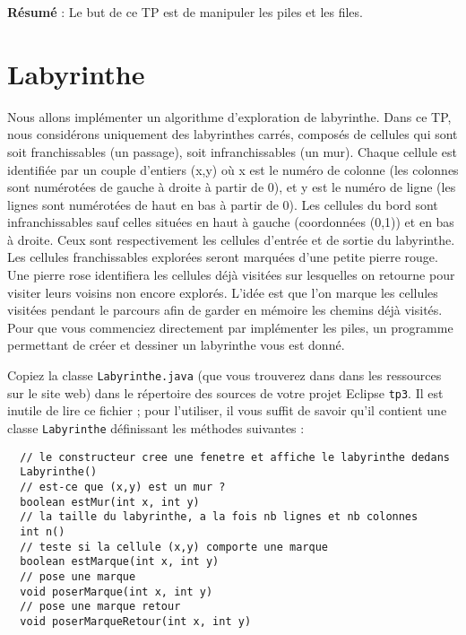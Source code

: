 \documentclass[iutinfo,a4paper,nocorrections,10pt]{ustl-tdtp}
\date{\annee{2018}--\annee{2019}}
\begin{document}
\maketitle
\thispagestyle{empty}


\sloppy
\textbf{Résumé }: Le but de ce TP est de manipuler les piles et les files.
\section{Labyrinthe}


Nous allons implémenter un algorithme d'exploration de labyrinthe. Dans ce TP, nous considérons uniquement des
labyrinthes carrés, composés de cellules qui sont soit franchissables (un passage), soit infranchissables (un mur). Chaque cellule est identifiée par un couple d’entiers (x,y) où x est le numéro de colonne (les colonnes sont numérotées de gauche
à droite à partir de 0), et y est le numéro de ligne (les lignes sont numérotées de haut en bas à partir de 0). Les
cellules du bord sont infranchissables sauf celles situées en haut à gauche (coordonnées (0,1)) et en bas à droite. Ceux sont
respectivement les cellules d'entrée et de sortie du labyrinthe.
Les cellules franchissables explorées seront marquées d’une petite pierre rouge. Une pierre rose identifiera les cellules déjà visitées sur lesquelles on retourne pour visiter leurs voisins non encore explorés. L'idée est que l'on
marque les cellules visitées pendant le parcours afin de garder en mémoire les chemins déjà visités.
Pour que vous commenciez directement par implémenter les piles, un programme permettant de créer et dessiner un
labyrinthe vous est donné.


Copiez la classe \texttt{Labyrinthe.java} (que vous trouverez dans dans les
ressources sur le site web) dans le répertoire des sources de votre projet Eclipse \texttt{tp3}. Il est inutile de lire ce fichier ; pour l'utiliser, il vous suffit de savoir qu'il contient une classe \texttt{Labyrinthe} définissant les méthodes suivantes :
\begin{verbatim}
  // le constructeur cree une fenetre et affiche le labyrinthe dedans
  Labyrinthe()
  // est-ce que (x,y) est un mur ?
  boolean estMur(int x, int y)
  // la taille du labyrinthe, a la fois nb lignes et nb colonnes
  int n()
  // teste si la cellule (x,y) comporte une marque
  boolean estMarque(int x, int y)
  // pose une marque
  void poserMarque(int x, int y)
  // pose une marque retour 
  void poserMarqueRetour(int x, int y) 
\end{verbatim}
\end{document}
